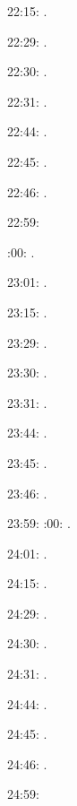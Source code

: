 \documentclass[italian]{article}
\begin{document}
22:15:     . 

22:29:     . 

22:30:     .

22:31:     .

22:44:     .

22:45:     .

22:46:     .

22:59:     

:00:    .

23:01:     . 

23:15:     . 

23:29:     . 

23:30:     .

23:31:     .

23:44:     .

23:45:     .

23:46:     .

23:59:     
:00:    .

24:01:     . 

24:15:     . 

24:29:     . 

24:30:     .

24:31:     .

24:44:     .

24:45:     .

24:46:     .

24:59:     
\end{document}
